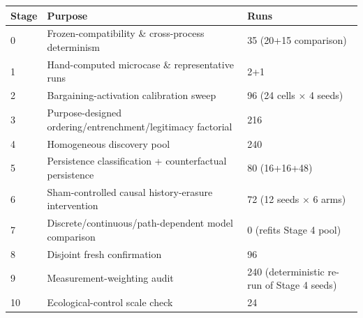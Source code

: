 \begin{tabular}{@{}lll@{}}
\toprule
\textbf{Stage} & \textbf{Purpose} & \textbf{Runs} \\
\midrule
0 & Frozen-compatibility \& cross-process determinism & 35 (20+15 comparison) \\
1 & Hand-computed microcase \& representative runs & 2+1 \\
2 & Bargaining-activation calibration sweep & 96 (24 cells $\times$ 4 seeds) \\
3 & Purpose-designed ordering/entrenchment/legitimacy factorial & 216 \\
4 & Homogeneous discovery pool & 240 \\
5 & Persistence classification + counterfactual persistence & 80 (16+16+48) \\
6 & Sham-controlled causal history-erasure intervention & 72 (12 seeds $\times$ 6 arms) \\
7 & Discrete/continuous/path-dependent model comparison & 0 (refits Stage 4 pool) \\
8 & Disjoint fresh confirmation & 96 \\
9 & Measurement-weighting audit & 240 (deterministic re-run of Stage 4 seeds) \\
10 & Ecological-control scale check & 24 \\
\bottomrule
\end{tabular}
